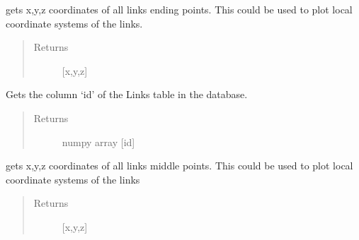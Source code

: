\documentclass[letterpaper,10pt,english]{sphinxmanual}
\begin{document}
\begin{fulllineitems}
\begin{fulllineitems}
\label{\detokenize{api:beamon.database.Database.get_links_ending_points}}
gets x,y,z coordinates of all links ending points.
This could be used to plot local coordinate systems of the links.
\begin{quote}\begin{description}
\item[{Returns}] \leavevmode
{[}x,y,z{]}

\end{description}\end{quote}

\end{fulllineitems}


\begin{fulllineitems}
\label{\detokenize{api:beamon.database.Database.get_links_indexes}}
Gets the column ‘id’ of the Links table in the database.
\begin{quote}\begin{description}
\item[{Returns}] \leavevmode
numpy array {[}id{]}

\end{description}\end{quote}

\end{fulllineitems}


\begin{fulllineitems}
\label{\detokenize{api:beamon.database.Database.get_links_middle_points}}
gets x,y,z coordinates of all links middle points.
This could be used to plot local coordinate systems of the links
\begin{quote}\begin{description}
\item[{Returns}] \leavevmode
{[}x,y,z{]}

\end{description}\end{quote}


\end{fulllineitems}
\end{fulllineitems}
\end{document}
